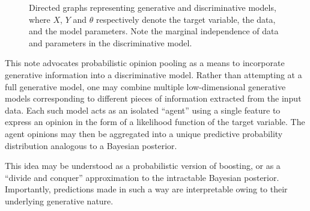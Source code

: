 \documentclass[english]{scrartcl}
\begin{document}

\begin{figure}[!ht]
\begin{center}
\hspace*{.2\textwidth}
\caption{Directed graphs representing generative and discriminative models, where $X$, $Y$ and $\theta$ respectively denote the target variable, the data, and the model parameters. Note the marginal independence of data and parameters in the discriminative model.}
\label{fig:graph_comparison}
\end{center}
\end{figure}

This note advocates probabilistic opinion pooling \cite{Genest-86} as a means to incorporate generative information into a discriminative model. Rather than attempting at a full generative model, one may combine multiple low-dimensional generative models corresponding to different pieces of information extracted from the input data. Each such model acts as an isolated ``agent'' using a single feature to express an opinion in the form of a likelihood function of the target variable. The agent opinions may then be aggregated into a unique predictive probability distribution analogous to a Bayesian posterior.

This idea may be understood as a probabilistic version of boosting, or as a ``divide and conquer'' approximation to the intractable Bayesian posterior. Importantly, predictions made in such a way are interpretable owing to their underlying generative nature.
\end{document}
